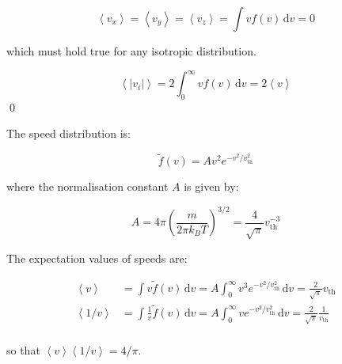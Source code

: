 \documentclass[12pt]{article}
\begin{document}

\begin{equation}
    \left\langle v_{x} \right\rangle = \left\langle v_{y} \right\rangle = \left\langle v_{z} \right\rangle = \int v f(v) \, \mathrm{d}v = 0
\end{equation}

which must hold true for any isotropic distribution.


\begin{equation}
    \left\langle \left\lvert v_{i} \right\rvert \right\rangle = 2 \int_{0}^{\infty} v f(v) \, \mathrm{d}v = 2 \left\langle v \right\rangle
\end{equation}
\qed



The speed distribution is:

\begin{equation}
    \tilde{f}(v) = A v^{2} e^{-v^{2}/v_{\text{th}}^{2}}
\end{equation}

where the normalisation constant $A$ is given by:

\begin{equation}
    A = 4\pi \left( \frac{m}{2\pi k_{B}T} \right)^{3/2} = \frac{4}{\sqrt{\pi}} v_{\text{th}}^{-3}
\end{equation}

The expectation values of speeds are:

\begin{equation}
    \begin{split}
        \left\langle v \right\rangle &= \int v \tilde{f}(v) \, \mathrm{d}v = A \int_{0}^{\infty} v^{3} e^{-v^{2}/v_{\text{th}}^{2}} \, \mathrm{d}v = \frac{2}{\sqrt{\pi}} v_{\text{th}} \\
        \left\langle 1/v \right\rangle &= \int \frac{1}{v} \tilde{f}(v) \, \mathrm{d}v = A \int_{0}^{\infty} v e^{-v^{2}/v_{\text{th}}^{2}} \, \mathrm{d}v = \frac{2}{\sqrt{\pi}} \frac{1}{v_{\text{th}}} \\
    \end{split}
\end{equation}

so that $\left\langle v \right\rangle \left\langle 1/v \right\rangle = 4/\pi$.

\end{document}
